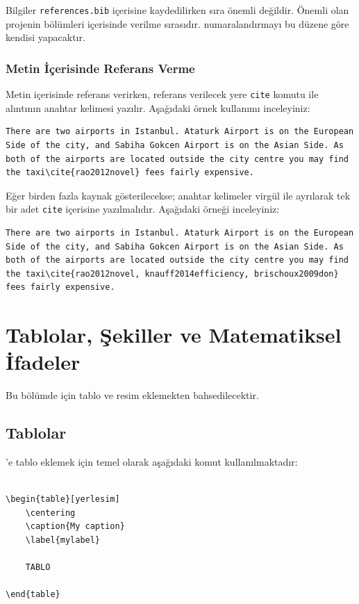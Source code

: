 Bilgiler \texttt{references.bib} içerisine kaydedilirken sıra önemli değildir. Önemli olan projenin bölümleri içerisinde verilme sırasıdır. \latex numaralandırmayı bu düzene göre kendisi yapacaktır.

\subsection{Metin İçerisinde Referans Verme}
Metin içerisinde referans verirken, referans verilecek yere \texttt{cite} komutu ile alıntının anahtar kelimesi yazılır. Aşağıdaki örnek kullanımı inceleyiniz:

\begin{verbatim}
There are two airports in Istanbul. Ataturk Airport is on the European Side of the city, and Sabiha Gokcen Airport is on the Asian Side. As both of the airports are located outside the city centre you may find the taxi\cite{rao2012novel} fees fairly expensive. 
\end{verbatim}

Eğer birden fazla kaynak gösterilecekse; anahtar kelimeler virgül ile ayrılarak tek bir adet \texttt{cite} içerisine yazılmalıdır. Aşağıdaki örneği inceleyiniz:

\begin{verbatim}
There are two airports in Istanbul. Ataturk Airport is on the European Side of the city, and Sabiha Gokcen Airport is on the Asian Side. As both of the airports are located outside the city centre you may find the taxi\cite{rao2012novel, knauff2014efficiency, brischoux2009don} fees fairly expensive. 
\end{verbatim}

\chapter{Tablolar, Şekiller ve Matematiksel İfadeler}

Bu bölümde \latex için tablo ve resim eklemekten bahsedilecektir.

\section{Tablolar}
\latexx'e tablo eklemek için temel olarak aşağıdaki komut kullanılmaktadır:

\begin{verbatim}

\begin{table}[yerlesim]
    \centering
    \caption{My caption}
    \label{mylabel}
    
    TABLO

\end{table}

\end{verbatim}

